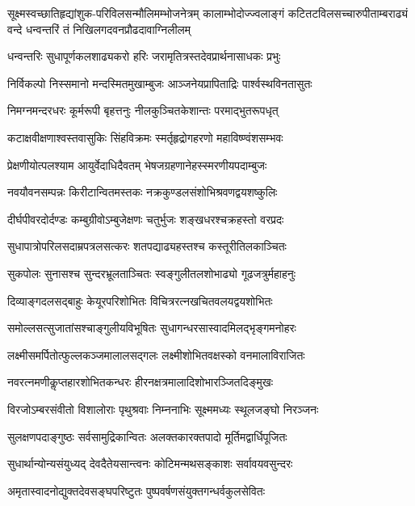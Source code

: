 

{सूक्ष्मस्वच्छातिहृद्यांशुक-परिविलसन्मौलिमम्भोजनेत्रम्}
{कालाम्भोदोज्ज्वलाङ्गं कटितटविलसच्चारुपीताम्बराढ्यं}
{वन्दे धन्वन्तरिं तं निखिलगदवनप्रौढदावाग्निलीलम्}

\twolineshloka
{धन्वन्तरिः सुधापूर्णकलशाढ्यकरो हरिः}
{जरामृतित्रस्तदेवप्रार्थनासाधकः प्रभुः}

\twolineshloka
{निर्विकल्पो निस्समानो मन्दस्मितमुखाम्बुजः}
{आञ्जनेयप्रापिताद्रिः पार्श्वस्थविनतासुतः}

\twolineshloka
{निमग्नमन्दरधरः कूर्मरूपी बृहत्तनुः}
{नीलकुञ्चितकेशान्तः परमाद्भुतरूपधृत्}

\twolineshloka
{कटाक्षवीक्षणाश्वस्तवासुकिः सिंहविक्रमः}
{स्मर्तृहृद्रोगहरणो महाविष्ण्वंशसम्भवः}

\twolineshloka
{प्रेक्षणीयोत्पलश्याम आयुर्वेदाधिदैवतम्}
{भेषजग्रहणानेहस्स्मरणीयपदाम्बुजः}

\twolineshloka
{नवयौवनसम्पन्नः किरीटान्वितमस्तकः}
{नक्रकुण्डलसंशोभिश्रवणद्वयशष्कुलिः}

\twolineshloka
{दीर्घपीवरदोर्दण्डः कम्बुग्रीवोऽम्बुजेक्षणः}
{चतुर्भुजः शङ्खधरश्चक्रहस्तो वरप्रदः}

\twolineshloka
{सुधापात्रोपरिलसदाम्रपत्रलसत्करः}
{शतपद्याढ्यहस्तश्च कस्तूरीतिलकाञ्चितः}

\twolineshloka
{सुकपोलः सुनासश्च सुन्दरभ्रूलताञ्चितः}
{स्वङ्गुलीतलशोभाढ्यो गूढजत्रुर्महाहनुः}

\twolineshloka
{दिव्याङ्गदलसद्बाहुः केयूरपरिशोभितः}
{विचित्ररत्नखचितवलयद्वयशोभितः}

\twolineshloka
{समोल्लसत्सुजातांसश्चाङ्गुलीयविभूषितः}
{सुधागन्धरसास्वादमिलद्भृङ्गमनोहरः}

\twolineshloka
{लक्ष्मीसमर्पितोत्फुल्लकञ्जमालालसद्गलः}
{लक्ष्मीशोभितवक्षस्को वनमालाविराजितः}

\twolineshloka
{नवरत्नमणीकॢप्तहारशोभितकन्धरः}
{हीरनक्षत्रमालादिशोभारञ्जितदिङ्मुखः}

\twolineshloka
{विरजोऽम्बरसंवीतो विशालोराः पृथुश्रवाः}
{निम्ननाभिः सूक्ष्ममध्यः स्थूलजङ्घो निरञ्जनः}

\twolineshloka
{सुलक्षणपदाङ्गुष्ठः सर्वसामुद्रिकान्वितः}
{अलक्तकारक्तपादो मूर्तिमद्वार्धिपूजितः}

\twolineshloka
{सुधार्थान्योन्यसंयुध्यद् देवदैतेयसान्त्वनः}
{कोटिमन्मथसङ्काशः सर्वावयवसुन्दरः}

\twolineshloka
{अमृतास्वादनोद्युक्तदेवसङ्घपरिष्टुतः}
{पुष्पवर्षणसंयुक्तगन्धर्वकुलसेवितः}

